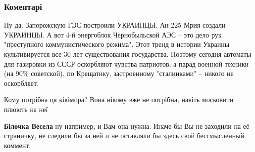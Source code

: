  
 
 
 
 
\subsubsection{Коментарі}
\label{sec:12_09_2021.fb.nikonov_sergej.1.bilchenko_dragomanova_podrobnosti.cmt}

\begin{itemize} %
 
Ну да.
Запорожскую ГЭС построили УКРАИНЦЫ.
Ан-225 Мрия создали УКРАИНЦЫ.
А вот 4-й энергоблок Чернобыльской АЭС – это дело рук "преступного коммунистического режима".
Этот тренд в истории Украины культивируется все 30 лет существования государства.
Поэтому сегодня автоматы для газировки из СССР оскорбляют чувства патриотов, а
парад военной техники (на 90\% советской), по Крещатику, застроенному
"сталинками" – никого не оскорбляет.

 
Кому потрібна ця кікімора? Вона нікому вже не потрібна, навіть московити плюють на неї
\begin{itemize} %
 
\textbf{Білочка Весела} ну например, и Вам она нужна. Иначе бы Вы не заходили
на её страничку, не следили бы за ней и не оставляли бы здесь свой
бессмысленный коммент.
\end{itemize} %


\end{itemize}
